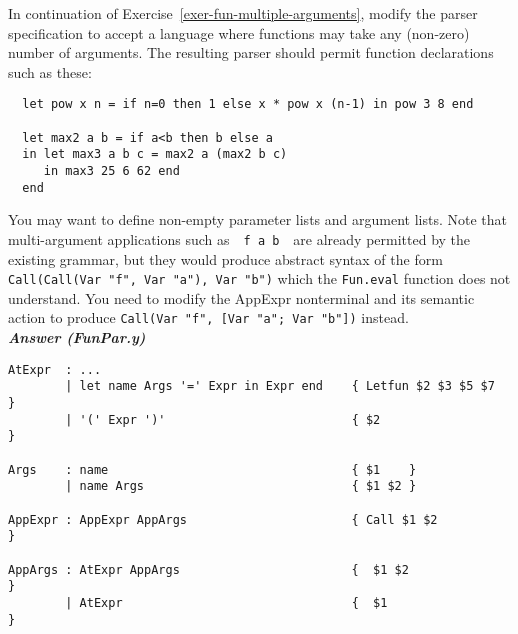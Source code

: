 \documentclass[a4paper]{article}
\begin{document}
\begin{exercise}\label{exer-fun-multiple-arguments-parse}
  In continuation of Exercise~\ref{exer-fun-multiple-arguments},
  modify the parser specification to accept a language where functions
  may take any (non-zero) number of arguments.  The resulting parser
  should permit function declarations such as these:

{\codesetup\begin{verbatim}
  let pow x n = if n=0 then 1 else x * pow x (n-1) in pow 3 8 end

  let max2 a b = if a<b then b else a
  in let max3 a b c = max2 a (max2 b c)
     in max3 25 6 62 end
  end
\end{verbatim}}


\noindent 
You may want to define non-empty parameter lists and argument lists.  Note that multi-argument applications such as\ \ 
\texttt{f a b}\ \ are already permitted by the existing grammar, but
they would produce abstract syntax of the form \texttt{Call(Call(Var
  "f", Var "a"), Var "b")} which the \texttt{Fun.eval} function does
not understand.  You need to modify the AppExpr nonterminal and its
semantic action to produce \texttt{Call(Var "f", [Var "a"; Var "b"])}
instead.\\

\noindent
\textbf{\emph{Answer (FunPar.y)}} 
{\codesetup\begin{verbatim}
AtExpr  : ...
        | let name Args '=' Expr in Expr end    { Letfun $2 $3 $5 $7    }
        | '(' Expr ')'                          { $2                    }

Args    : name                                  { $1    }
        | name Args                             { $1 $2 }
        
AppExpr : AppExpr AppArgs                       { Call $1 $2            }
  
AppArgs : AtExpr AppArgs                        {  $1 $2                }
        | AtExpr                                {  $1                   }
\end{verbatim}}

\end{exercise}
\end{document}
